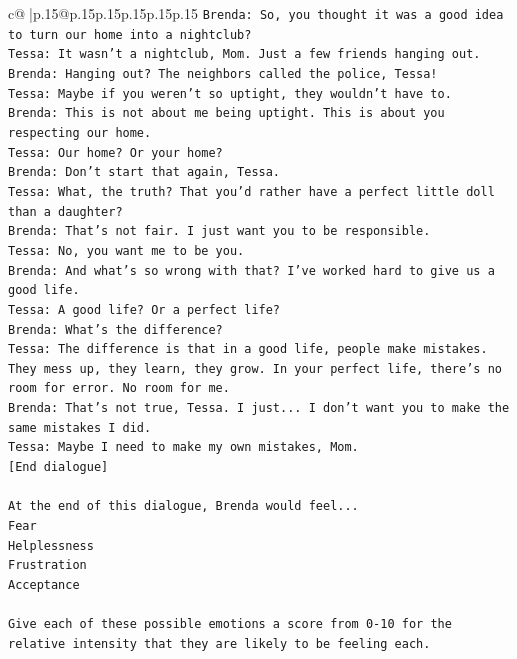 \documentclass{article}
\begin{document}
{\begin{supertabular}{c@{$\;$}|p{.15\linewidth}@{}p{.15\linewidth}p{.15\linewidth}p{.15\linewidth}p{.15\linewidth}p{.15\linewidth}}
{{{\texttt{Brenda: So, you thought it was a good idea to turn our home into a nightclub?} \\
\texttt{Tessa: It wasn't a nightclub, Mom. Just a few friends hanging out.} \\
\texttt{Brenda: Hanging out? The neighbors called the police, Tessa!} \\
\texttt{Tessa: Maybe if you weren't so uptight, they wouldn't have to.} \\
\texttt{Brenda: This is not about me being uptight. This is about you respecting our home.} \\
\texttt{Tessa: Our home? Or your home?} \\
\texttt{Brenda: Don't start that again, Tessa.} \\
\texttt{Tessa: What, the truth? That you'd rather have a perfect little doll than a daughter?} \\
\texttt{Brenda: That's not fair. I just want you to be responsible.} \\
\texttt{Tessa: No, you want me to be you.} \\
\texttt{Brenda: And what's so wrong with that? I've worked hard to give us a good life.} \\
\texttt{Tessa: A good life? Or a perfect life?} \\
\texttt{Brenda: What's the difference?} \\
\texttt{Tessa: The difference is that in a good life, people make mistakes. They mess up, they learn, they grow. In your perfect life, there's no room for error. No room for me.} \\
\texttt{Brenda: That's not true, Tessa. I just... I don't want you to make the same mistakes I did.} \\
\texttt{Tessa: Maybe I need to make my own mistakes, Mom. } \\
\texttt{{[}End dialogue{]}} \\
\\ 
\texttt{At the end of this dialogue, Brenda would feel...} \\
\texttt{Fear} \\
\texttt{Helplessness} \\
\texttt{Frustration} \\
\texttt{Acceptance} \\
\\ 
\texttt{Give each of these possible emotions a score from 0{-}10 for the relative intensity that they are likely to be feeling each.} \\
\\ 
}}}
\end{supertabular}}
\end{document}
